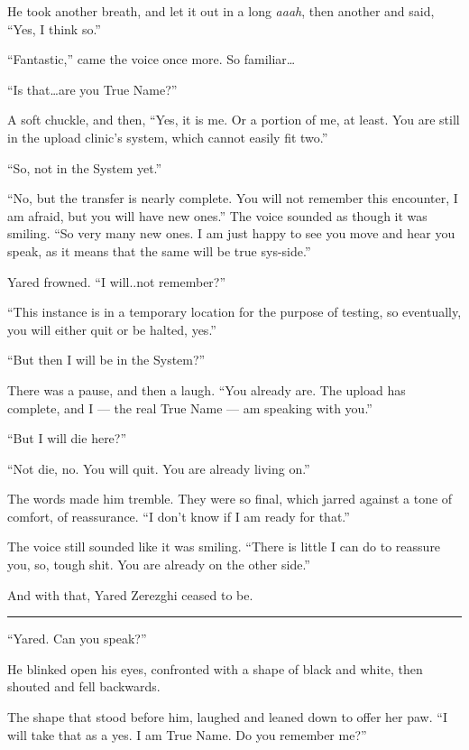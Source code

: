 He took another breath, and let it out in a long \emph{aaah}, then another and said, ``Yes, I think so.''

``Fantastic,'' came the voice once more. So familiar\ldots{}

``Is that\ldots are you True Name?''

A soft chuckle, and then, ``Yes, it is me. Or a portion of me, at least. You are still in the upload clinic's system, which cannot easily fit two.''

``So, not in the System yet.''

``No, but the transfer is nearly complete. You will not remember this encounter, I am afraid, but you will have new ones.'' The voice sounded as though it was smiling. ``So very many new ones. I am just happy to see you move and hear you speak, as it means that the same will be true sys-side.''

Yared frowned. ``I will..not remember?''

``This instance is in a temporary location for the purpose of testing, so eventually, you will either quit or be halted, yes.''

``But then I will be in the System?''

There was a pause, and then a laugh. ``You already are. The upload has complete, and I — the real True Name — am speaking with you.''

``But I will die here?''

``Not die, no. You will quit. You are already living on.''

The words made him tremble. They were so final, which jarred against a tone of comfort, of reassurance. ``I don't know if I am ready for that.''

The voice still sounded like it was smiling. ``There is little I can do to reassure you, so, tough shit. You are already on the other side.''

And with that, Yared Zerezghi ceased to be.

\begin{center}\rule{0.5\linewidth}{0.5pt}\end{center}

``Yared. Can you speak?''

He blinked open his eyes, confronted with a shape of black and white, then shouted and fell backwards.

The shape that stood before him, laughed and leaned down to offer her paw. ``I will take that as a yes. I am True Name. Do you remember me?''

